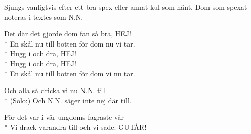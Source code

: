 \begin{SongText}
    \begin{SongInfo}
        Sjungs vanligtvis efter ett bra spex eller annat kul som hänt. Dom som spexat noteras i textes som N.N.
    \end{SongInfo}
    \begin{SongVerse}
        Det där det gjorde dom fan så bra, HEJ!\\*%
        En skål nu till botten för dom nu vi tar.\\*%
        Hugg i och dra, HEJ!\\*%
        Hugg i och dra, HEJ!\\*%
        En skål nu till botten för dom vi nu tar.
    \end{SongVerse}
    \begin{SongVerse}
        Och alla så dricka vi nu N.N. till\\*%
        (Solo:) Och N.N. säger inte nej där till.
    \end{SongVerse}
    \begin{SongVerse}
        För det var i vår ungdoms fagraste vår\\*%
        Vi drack varandra till och vi sade: GUTÅR!
    \end{SongVerse}
\end{SongText}
